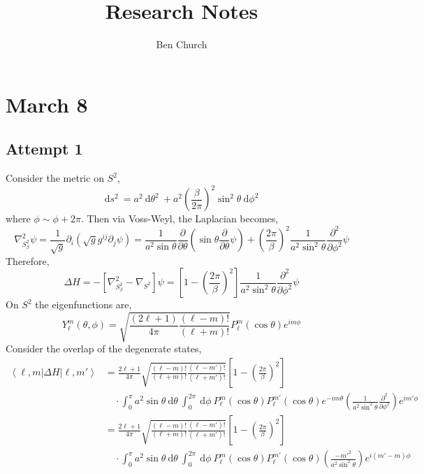 \documentclass[12pt]{extarticle}
\renewcommand{\d}[1]{\: \mathrm{d}#1 \:}
\newcommand{\pderiv}[2]{\frac{\partial{#1}}{\partial{#2}}}
\newcommand{\parsq}[2]{\frac{\partial^2{#1}}{\partial{#2}^2}}
\newcommand{\bra}[1]{\left< #1 \right|}
\newcommand{\ket}[1]{\left| #1 \right>}
\theoremstyle{definition}
\begin{document}
\title{Research Notes}
\author{Ben Church}
\maketitle
\tableofcontents
\newpage


\section{March 8}

\subsection{Attempt 1}

Consider the metric on $S^2$,
\[ \d{s^2} = a^2 \d{\theta^2} + a^2 \left( \frac{\beta}{2 \pi} \right)^2 \sin^2{\theta} \d{\phi^2} \]
where $\phi \sim \phi + 2 \pi$. Then via Voss-Weyl, the Laplacian becomes,
\[ \nabla^2_{S^2_\beta} \psi = \frac{1}{\sqrt{g}} \partial_i (\sqrt{g} g^{ij} \partial_j \psi ) = \frac{1}{a^2 \sin{\theta}} \pderiv{}{\theta} \left( \sin{\theta} \pderiv{}{\theta} \psi \right) + \left(\frac{2 \pi}{\beta} \right)^2 \frac{1}{a^2 \sin^2{\theta}} \parsq{}{\phi} \psi  \]
Therefore,
\[ \Delta H = -[\nabla^2_{S^2_\beta} - \nabla_{S^2}] \psi = \left[ 1 -  \left(\frac{2 \pi}{\beta} \right)^2  \right] \frac{1}{a^2 \sin^2{\theta}} \parsq{}{\phi} \psi \]
On $S^2$ the eigenfunctions are,
\[ Y_{\ell}^m(\theta, \phi) = \sqrt{\frac{(2 \ell + 1)}{4 \pi} \frac{(\ell - m)!}{(\ell + m)!}} P^m_{\ell}(\cos{\theta}) e^{i m \phi} \] 
Consider the overlap of the degenerate states,
\begin{align*}
\bra{\ell, m} \Delta H \ket{\ell, m'} & = \frac{2 \ell + 1}{4 \pi} \sqrt{\frac{(\ell - m)!}{(\ell + m)!} \frac{(\ell - m')!}{(\ell + m')!}} \left[ 1 -  \left(\frac{2 \pi}{\beta} \right)^2  \right]
\\
& \quad \cdot \int_0^{\pi} a^2 \sin{\theta} \d{\theta} \int_0^{2 \pi} \d{\phi} P^{m}_{\ell}(\cos{\theta}) P^{m'}_{\ell}(\cos{\theta}) e^{-im\theta} \left(  \frac{1}{a^2 \sin^2{\theta}} \parsq{}{\phi}  \right) e^{i m' \phi}
\\
& = \frac{2 \ell + 1}{4 \pi} \sqrt{\frac{(\ell - m)!}{(\ell + m)!} \frac{(\ell - m')!}{(\ell + m')!}} \left[ 1 -  \left(\frac{2 \pi}{\beta} \right)^2  \right]
\\
& \quad \cdot \int_0^{\pi} a^2 \sin{\theta} \d{\theta} \int_0^{2 \pi} \d{\phi} P^{m}_{\ell}(\cos{\theta}) P^{m'}_{\ell}(\cos{\theta})  \left(  \frac{-m'^2}{a^2 \sin^2{\theta}}  \right) e^{i (m' - m) \phi}
\end{align*}
\end{document}
